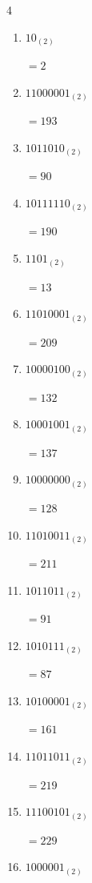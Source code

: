 \begin{multicols}{4}
\begin{enumerate}
        $=190$

  \item $10_{(2)}$

        $=2$

  \item $11000001_{(2)}$

        $=193$

  \item $1011010_{(2)}$

        $=90$

  \item $10111110_{(2)}$

        $=190$

  \item $1101_{(2)}$

        $=13$

  \item $11010001_{(2)}$

        $=209$

  \item $10000100_{(2)}$

        $=132$

  \item $10001001_{(2)}$

        $=137$

\columnbreak %

  \item $10000000_{(2)}$

        $=128$

  \item $11010011_{(2)}$

        $=211$

  \item $1011011_{(2)}$

        $=91$

  \item $1010111_{(2)}$

        $=87$

  \item $10100001_{(2)}$

        $=161$

  \item $11011011_{(2)}$

        $=219$

  \item $11100101_{(2)}$

        $=229$

  \item $1000001_{(2)}$


\end{enumerate}
\end{multicols}
